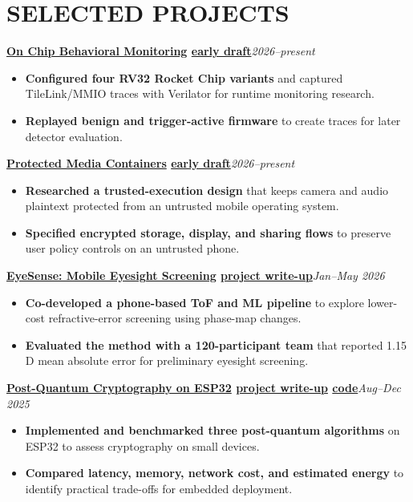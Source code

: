 \documentclass[10pt]{article}
\newcommand{\entry}[3]{\textbf{#1}\hfill {\small\itshape #2}\\[-1pt]{#3}\par}
\newcommand{\link}[2]{\href{#1}{#2}}
\begin{document}
\section*{SELECTED PROJECTS}
\entry{\link{https://kac224.github.io/\#projects}{On Chip Behavioral Monitoring} \textperiodcentered{} \link{https://kac224.github.io/assets/writeups/on-chip-behavioral-monitoring-draft.pdf}{early draft}}{2026--present}{}
\begin{itemize}
\item \textbf{Configured four RV32 Rocket Chip variants} and captured TileLink/MMIO traces with Verilator for runtime monitoring research.
\item \textbf{Replayed benign and trigger-active firmware} to create traces for later detector evaluation.
\end{itemize}
\entry{\link{https://kac224.github.io/\#projects}{Protected Media Containers} \textperiodcentered{} \link{https://kac224.github.io/assets/writeups/protected-media-containers-early-draft.pdf}{early draft}}{2026--present}{}
\begin{itemize}
\item \textbf{Researched a trusted-execution design} that keeps camera and audio plaintext protected from an untrusted mobile operating system.
\item \textbf{Specified encrypted storage, display, and sharing flows} to preserve user policy controls on an untrusted phone.
\end{itemize}
\entry{\link{https://kac224.github.io/\#projects}{EyeSense: Mobile Eyesight Screening} \textperiodcentered{} \link{https://kac224.github.io/assets/writeups/eyesense.pdf}{project write-up}}{Jan--May 2026}{}
\begin{itemize}
\item \textbf{Co-developed a phone-based ToF and ML pipeline} to explore lower-cost refractive-error screening using phase-map changes.
\item \textbf{Evaluated the method with a 120-participant team} that reported 1.15 D mean absolute error for preliminary eyesight screening.
\end{itemize}
\entry{\link{https://kac224.github.io/\#projects}{Post-Quantum Cryptography on ESP32} \textperiodcentered{} \link{https://kac224.github.io/assets/writeups/post-quantum-esp32.pdf}{project write-up} \textperiodcentered{} \link{https://github.com/KAC224/cryptography-final-project}{code}}{Aug--Dec 2025}{}
\begin{itemize}
\item \textbf{Implemented and benchmarked three post-quantum algorithms} on ESP32 to assess cryptography on small devices.
\item \textbf{Compared latency, memory, network cost, and estimated energy} to identify practical trade-offs for embedded deployment.
\end{itemize}
\end{document}
